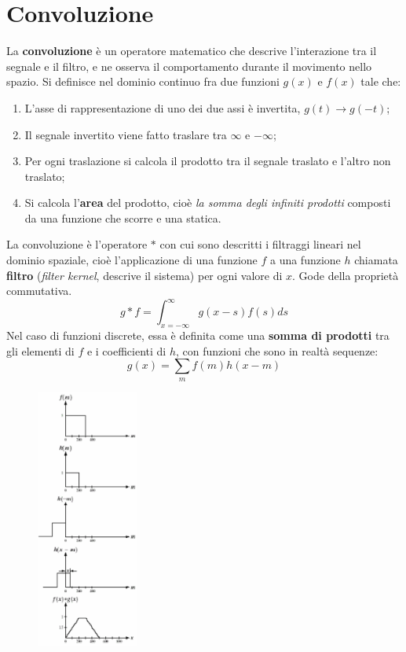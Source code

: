 \section{Convoluzione}
La \textbf{convoluzione} è un operatore matematico che descrive l'interazione tra il segnale e il filtro, e ne osserva il comportamento durante il movimento nello spazio. Si definisce nel dominio continuo fra due funzioni $g(x)$ e $f(x)$ tale che:
\begin{enumerate}
	\item L'asse di rappresentazione di uno dei due assi è invertita, $g(t) \rightarrow g(-t)$;
	\item Il segnale invertito viene fatto traslare tra $\infty$ e $-\infty$;
	\item Per ogni traslazione si calcola il prodotto tra il segnale traslato e l'altro non traslato;
	\item Si calcola l'\textbf{area} del prodotto, cioè \textit{la somma degli infiniti prodotti} composti da una funzione che scorre e una statica.
\end{enumerate}
La convoluzione è l'operatore $*$ con cui sono descritti i filtraggi lineari nel dominio spaziale, cioè l'applicazione di una funzione $f$ a una funzione $h$ chiamata \textbf{filtro} (\textit{filter kernel}, descrive il sistema) per ogni valore di $x$. Gode della proprietà commutativa.
$$g * f = \int_{x=-\infty}^{\infty}g(x - s)f(s) ds$$
Nel caso di funzioni discrete, essa è definita come una \textbf{somma di prodotti} tra gli elementi di $f$ e i coefficienti di $h$, con funzioni che sono in realtà sequenze:
$$g(x) = \sum_{m}f(m)h(x - m)$$

\begin{figure}
	\vspace{-15pt}
	\includegraphics[width=0.3\textwidth]{Lezioni/Immagini/convoluzione}
	\vspace{-15pt}
\end{figure}

